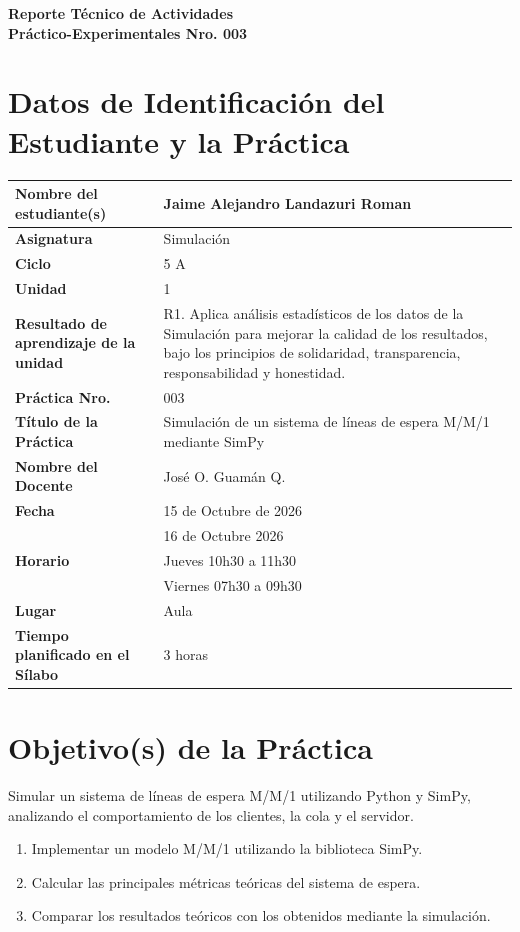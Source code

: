 \documentclass[11pt,a4paper]{article}
\begin{document}
\thispagestyle{fancy}

\vspace*{0.15cm}

\begin{center}
{\bfseries\fontsize{23}{26}\selectfont
Reporte Técnico de Actividades\\
Práctico-Experimentales Nro. 003\par}
\end{center}

\section{Datos de Identificación del Estudiante y la Práctica}

\noindent
\begin{tabularx}{\textwidth}{|L{0.43\textwidth}|Y|}
\hline
\textbf{Nombre del estudiante(s)} & Jaime Alejandro Landazuri Roman \\ \hline
\textbf{Asignatura} & Simulación \\ \hline
\textbf{Ciclo} & 5 A \\ \hline
\textbf{Unidad} & 1 \\ \hline
\textbf{Resultado de aprendizaje de la unidad} & R1. Aplica análisis estadísticos de los datos
de la Simulación para mejorar la calidad de los resultados, bajo los principios de solidaridad, transparencia, responsabilidad y honestidad. \\ \hline
\textbf{Práctica Nro.} & 003 \\ \hline
\textbf{Título de la Práctica} & Simulación de un sistema de líneas de espera M/M/1 mediante SimPy \\ \hline
\textbf{Nombre del Docente} & José O. Guamán Q. \\ \hline
\textbf{Fecha} & 15 de Octubre de 2026 \\
 & 16 de Octubre 2026 \\ \hline
\textbf{Horario} & Jueves 10h30 a 11h30 \\
 & Viernes 07h30 a 09h30 \\ \hline
\textbf{Lugar} & Aula \\ \hline
\textbf{Tiempo planificado en el Sílabo} & 3 horas \\ \hline
\end{tabularx}

\section{Objetivo(s) de la Práctica}
Simular un sistema de líneas de espera M/M/1 utilizando Python y SimPy, analizando
el comportamiento de los clientes, la cola y el servidor.
\begin{enumerate}
    \item Implementar un modelo M/M/1 utilizando la biblioteca SimPy.
    \item Calcular las principales métricas teóricas del sistema de espera.
    \item Comparar los resultados teóricos con los obtenidos mediante la simulación.
\end{enumerate}
\end{document}
